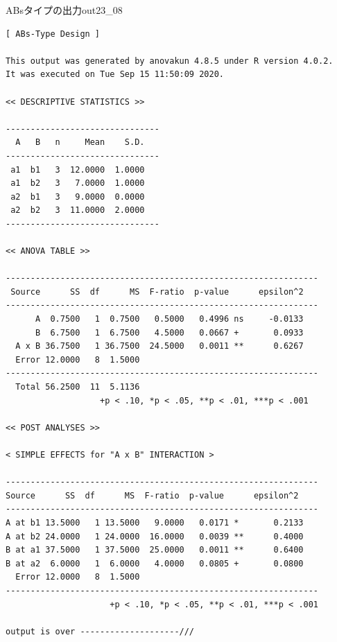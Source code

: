 \begin{Rscreen}{ABsタイプの出力}{out23_08}
	\begin{verbatim}
[ ABs-Type Design ]

This output was generated by anovakun 4.8.5 under R version 4.0.2.
It was executed on Tue Sep 15 11:50:09 2020.

<< DESCRIPTIVE STATISTICS >>

-------------------------------
  A   B   n     Mean    S.D. 
-------------------------------
 a1  b1   3  12.0000  1.0000 
 a1  b2   3   7.0000  1.0000 
 a2  b1   3   9.0000  0.0000 
 a2  b2   3  11.0000  2.0000 
-------------------------------

<< ANOVA TABLE >>

---------------------------------------------------------------
 Source      SS  df      MS  F-ratio  p-value      epsilon^2 
---------------------------------------------------------------
      A  0.7500   1  0.7500   0.5000   0.4996 ns     -0.0133 
      B  6.7500   1  6.7500   4.5000   0.0667 +       0.0933 
  A x B 36.7500   1 36.7500  24.5000   0.0011 **      0.6267 
  Error 12.0000   8  1.5000                                  
---------------------------------------------------------------
  Total 56.2500  11  5.1136                                  
                   +p < .10, *p < .05, **p < .01, ***p < .001

<< POST ANALYSES >>

< SIMPLE EFFECTS for "A x B" INTERACTION >

---------------------------------------------------------------
Source      SS  df      MS  F-ratio  p-value      epsilon^2 
---------------------------------------------------------------
A at b1 13.5000   1 13.5000   9.0000   0.0171 *       0.2133 
A at b2 24.0000   1 24.0000  16.0000   0.0039 **      0.4000 
B at a1 37.5000   1 37.5000  25.0000   0.0011 **      0.6400 
B at a2  6.0000   1  6.0000   4.0000   0.0805 +       0.0800 
  Error 12.0000   8  1.5000                                  
---------------------------------------------------------------
                     +p < .10, *p < .05, **p < .01, ***p < .001

output is over --------------------///
\end{verbatim}
\end{Rscreen}
